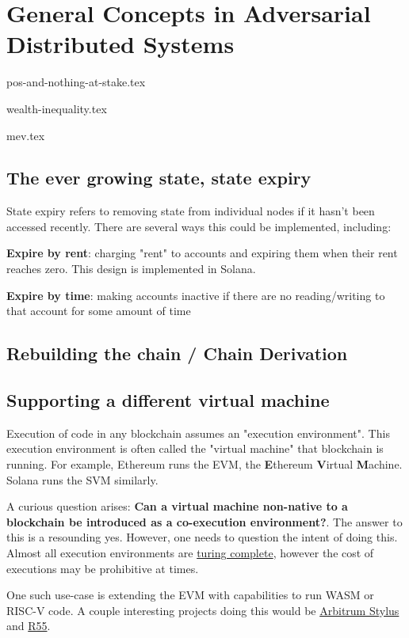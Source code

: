 \chapter{General Concepts in Adversarial Distributed Systems}

{pos-and-nothing-at-stake.tex}

{wealth-inequality.tex}

{mev.tex}

\section{The ever growing state, state expiry}
State expiry refers to removing state from individual nodes if it hasn't been accessed recently. There are several ways this could be implemented, including:

\textbf{Expire by rent}: charging "rent" to accounts and expiring them when their rent reaches zero. This design is implemented in Solana.

\textbf{Expire by time}: making accounts inactive if there are no reading/writing to that account for some amount of time


\section{Rebuilding the chain / Chain Derivation}

\section{Supporting a different virtual machine}
Execution of code in any blockchain assumes an "execution environment". This execution environment is often called the "virtual machine" that blockchain is running. For example, Ethereum runs the EVM, the \textbf{E}thereum \textbf{V}irtual \textbf{M}achine. Solana runs the SVM similarly.

A curious question arises: \textbf{Can a virtual machine non-native to a blockchain be introduced as a co-execution environment?}. The answer to this is a resounding yes. However, one needs to question the intent of doing this. Almost all execution environments are \href{https://www.bitstamp.net/learn/blockchain/what-is-turing-complete/}{turing complete}, however the cost of executions may be prohibitive at times.

One such use-case is extending the EVM with capabilities to run WASM or RISC-V code. A couple interesting projects doing this would be \href{https://arbitrum.io/stylus}{Arbitrum Stylus} and \href{https://hackmd.io/@leoalt/r55}{R55}.


